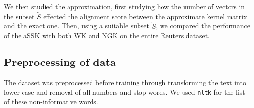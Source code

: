We then studied the approximation, first studying how the number of vectors in the subset $ \tilde{S} $ effected the alignment score between the approximate kernel matrix and the exact one. Then, using a suitable subset $ \tilde{S} $, we compared the performance of the aSSK with both WK and NGK on the entire Reuters dataset.

\subsection{Preprocessing of data}
The dataset was preprocessed before training through  transforming the text into lower case and removal of all numbers and stop words. We used \texttt{nltk} for the list of these non-informative words.


